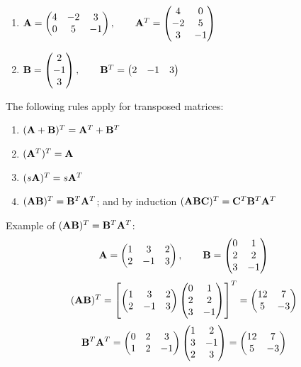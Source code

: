 \documentclass[]{book}
\theoremstyle{definition}
\theoremstyle{definition}
\theoremstyle{definition}
\theoremstyle{remark}
\begin{document}
\begin{enumerate}
        \item ${\bf A}=\begin{pmatrix} 4&-2&3\\0&5&-1\end{pmatrix}, \qquad {\bf A}^T=\begin{pmatrix} 4&0\\-2&5\\3&-1 \end{pmatrix}$
        \item ${\bf B}=\begin{pmatrix} 2\\-1\\3 \end{pmatrix}, \qquad {\bf B}^T=\begin{pmatrix} 2&-1&3\end{pmatrix}$
    \end{enumerate}

The following rules apply for transposed matrices:

\begin{enumerate}
        \item $({\bf A+B})^T = {\bf A}^T+{\bf B}^T$
        \item $({\bf A}^T)^T={\bf A}$
        \item $(s{\bf A})^T = s{\bf A}^T$
        \item $({\bf AB})^T = {\bf B}^T{\bf A}^T$; and by induction $({\bf ABC})^T = {\bf C}^T{\bf B}^T{\bf A}^T$
\end{enumerate}

Example of \(({\bf AB})^T = {\bf B}^T{\bf A}^T\):
\[{\bf A}=\begin{pmatrix} 1&3&2\\2&-1&3\end{pmatrix}, \qquad {\bf B}=\begin{pmatrix} 0&1\\2&2\\3&-1\end{pmatrix}\]
\[ ({\bf AB})^T = \left[ \begin{pmatrix} 1&3&2\\2&-1&3\end{pmatrix} \begin{pmatrix} 0&1\\2&2\\3&-1\end{pmatrix} \right]^T = \begin{pmatrix} 12&7\\5&-3 \end{pmatrix}\]
\[ {\bf B}^T{\bf A}^T= \begin{pmatrix} 0&2&3\\1&2&-1 \end{pmatrix}  \begin{pmatrix} 1&2\\3&-1\\2&3 \end{pmatrix} = \begin{pmatrix} 12&7\\5&-3 \end{pmatrix}\]
\end{document}
